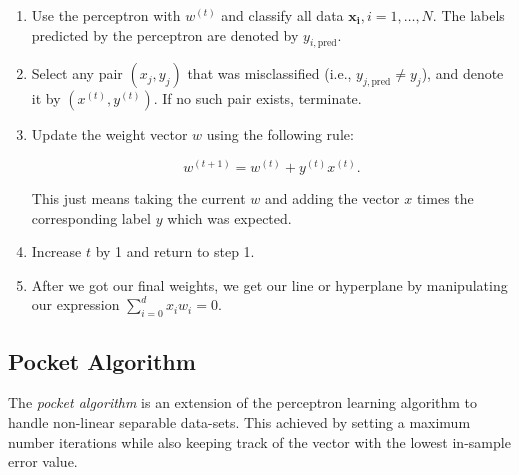 \begin{enumerate}

	\item Use the perceptron with \(w^{(t)}\) and classify all data \(\mathbf{x_i}, i = 1, \ldots, N\). The labels predicted by the perceptron are denoted by \(y_{i,\text{pred}}\).

	\item Select any pair \((x_j, y_j)\) that was misclassified (i.e., \(y_{j,\text{pred}} \neq y_j\)), and denote it by \((x^{(t)}, y^{(t)})\). If no such pair exists, terminate.

	\item Update the weight vector \(w\) using the following rule:

	      \[
		      w^{(t+1)} = w^{(t)} + y^{(t)} x^{(t)}.
	      \]

	      This just means taking the current \(w\) and adding the vector \(x\) times the corresponding label \(y\) which was expected.

	\item Increase \(t\) by 1 and return to step 1.

	\item After we got our final weights, we get our line or hyperplane by manipulating our
	expression \(\sum_{i = 0}^d x_i w_i = 0\).

\end{enumerate}

\subsection{Pocket Algorithm}

The \emph{pocket algorithm} is an extension of the perceptron learning algorithm to handle non-linear separable data-sets. This
achieved by setting a maximum number iterations while also keeping track of the vector with the lowest in-sample error value.

